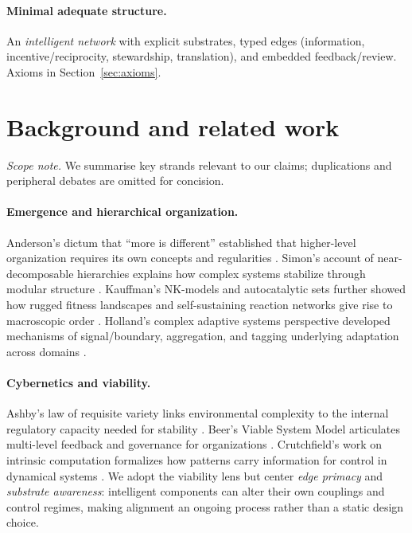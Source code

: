 \documentclass[12pt]{article}
\begin{document}
\paragraph{Minimal adequate structure.} An \emph{intelligent network} with explicit substrates, typed edges (information, incentive/reciprocity, stewardship, translation), and embedded feedback/review. Axioms in Section~\ref{sec:axioms}.

\section{Background and related work}
\noindent\textit{Scope note.} We summarise key strands relevant to our claims; duplications and peripheral debates are omitted for concision.


\paragraph{Emergence and hierarchical organization.}
Anderson’s dictum that ``more is different'' established that higher-level organization requires its own concepts and regularities \citep{Anderson1972}. Simon’s account of near-decomposable hierarchies explains how complex systems stabilize through modular structure \citep{Simon1962}. Kauffman’s NK-models and autocatalytic sets further showed how rugged fitness landscapes and self-sustaining reaction networks give rise to macroscopic order \citep{Kauffman1993}. Holland’s complex adaptive systems perspective developed mechanisms of signal/boundary, aggregation, and tagging underlying adaptation across domains \citep{Holland1992}.

\paragraph{Cybernetics and viability.}
Ashby’s law of requisite variety links environmental complexity to the internal regulatory capacity needed for stability \citep{Ashby1956}. Beer’s Viable System Model articulates multi-level feedback and governance for organizations \citep{Beer1972}. Crutchfield’s work on intrinsic computation formalizes how patterns carry information for control in dynamical systems \citep{Crutchfield1994}. We adopt the viability lens but center \emph{edge primacy} and \emph{substrate awareness}: intelligent components can alter their own couplings and control regimes, making alignment an ongoing process rather than a static design choice.
\end{document}
